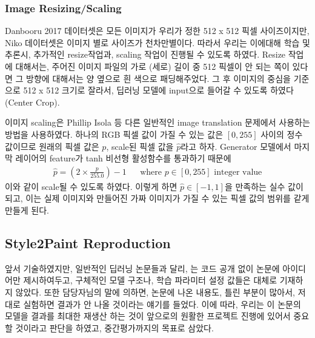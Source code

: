 \subsubsection{Image Resizing/Scaling}

Danbooru 2017 데이터셋은 모든 이미지가 우리가 정한 512 x 512 픽셀 사이즈이지만, Niko 데이터셋은 이미지 별로 사이즈가 천차만별이다.
따라서 우리는 이에대해 학습 및 추론시, 추가적인 resize작업과, scaling 작업이 진행될 수 있도록 하였다.
Resize 작업에 대해서는, 주어진 이미지 파일의 가로 (세로) 길이 중 512 픽셀이 안 되는 쪽이 있다면 그 방향에 대해서는 양 옆으로 흰 색으로 패딩해주었다.
그 후 이미지의 중심을 기준으로 512 x 512 크기로 잘라서, 딥러닝 모델에 input으로 들어갈 수 있도록 하였다 (Center Crop).

이미지 scaling은 Phillip Isola \cite{phillip2017}등 다른 일반적인 image translation 문제에서 사용하는 방법을 사용하였다. 하나의 RGB 픽셀 값이 가질 수 있는 값은 $[0, 255]$ 사이의 정수 값이므로 원래의 픽셀 값은 $p$, scale된 픽셀 값을 $\hat{p}$라고 하자. Generator 모델에서 마지막 레이어의 feature가 tanh 비선형 활성함수를 통과하기 때문에
\begin{align}
	\hat{p} = (2 \times \frac{p}{255.0}) - 1 && \text{where $p \in [0, 255]$ integer value}
\end{align}
이와 같이 scale될 수 있도록 하였다. 이렇게 하면 $\hat{p} \in [-1, 1]$을 만족하는 실수 값이 되고, 이는 실제 이미지와 만들어진 가짜 이미지가 가질 수 있는 픽셀 값의 범위를 같게 만들게 된다.

\subsection{Style2Paint Reproduction}

앞서 기술하였지만, 일반적인 딥러닝 논문들과 달리, \stylepaint 는 코드 공개 없이 논문에 아이디어만 제시하여두고, 구체적인 모델 구조나, 학습 파라미터 설정 값들은 대체로 기재하지 않았다.
또한 담당자님의 말에 의하면, 논문에 나온 내용도, 틀린 부분이 많아서, 저대로 실험하면 결과가 안 나올 것이라는 얘기를 들었다. 
이에 따라, 우리는 이 논문의 모델을 결과를 최대한 재생산 하는 것이 앞으로의 원활한 프로젝트 진행에 있어서 중요할 것이라고 판단을 하였고, 중간평가까지의 목표로 삼았다.